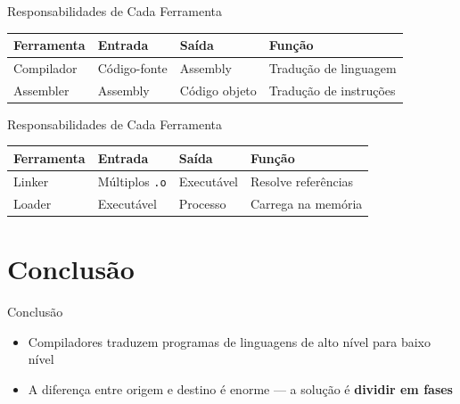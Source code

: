 \begin{frame}{Responsabilidades de Cada Ferramenta}

    \begin{table}
        \begin{tabular}{l l l l}
            \hline
Ferramenta & Entrada & Saída & Função \\
            \hline
            Compilador & Código-fonte & Assembly & Tradução de linguagem \\
            Assembler & Assembly & Código objeto & Tradução de instruções \\
            \hline
        \end{tabular}
    \end{table}
\end{frame}

\begin{frame}[fragile]{Responsabilidades de Cada Ferramenta}

    \begin{table}
        \begin{tabular}{l l l l}
            \hline
Ferramenta & Entrada & Saída & Função \\
            \hline
            Linker & Múltiplos \texttt{.o} & Executável & Resolve
            referências \\
            Loader & Executável & Processo & Carrega na memória \\
            \hline
        \end{tabular}
    \end{table}
\end{frame}


\section{Conclusão}\label{conclusuxe3o}

\begin{frame}{Conclusão}

    \begin{itemize}

        \item
        Compiladores traduzem programas de linguagens de alto nível para baixo
        nível
        \item
        A diferença entre origem e destino é enorme --- a solução é
        \textbf{dividir em fases}
    \end{itemize}
\end{frame}

